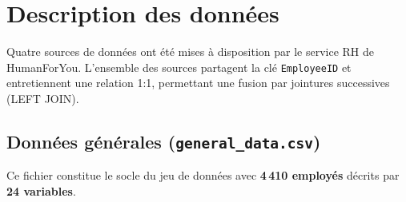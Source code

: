 
\section{Description des données}

Quatre sources de données ont été mises à disposition par le service RH de HumanForYou. L'ensemble des sources partagent la clé \texttt{EmployeeID} et entretiennent une relation 1:1, permettant une fusion par jointures successives (LEFT JOIN).

\subsection{Données générales (\texttt{general\_data.csv})}

Ce fichier constitue le socle du jeu de données avec \textbf{4\,410 employés} décrits par \textbf{24 variables}.

